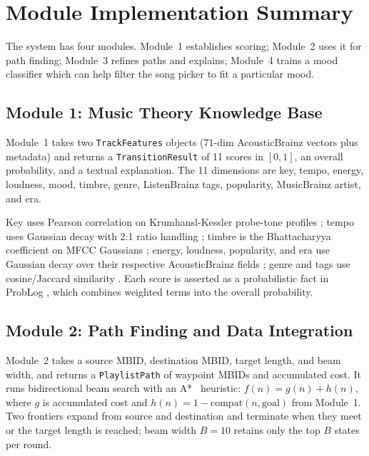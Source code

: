 \section{Module Implementation Summary}

The system has four modules. Module~1 establishes scoring; Module~2 uses it for path finding; Module~3 refines paths and explains; Module~4 trains a mood classifier which can help filter the song picker to fit a particular mood.

\subsection{Module 1: Music Theory Knowledge Base}

Module~1 takes two \texttt{TrackFeatures} objects (71-dim AcousticBrainz vectors plus metadata) and returns a \texttt{TransitionResult} of 11 scores in $[0,1]$, an overall probability, and a textual explanation. The 11 dimensions are key, tempo, energy, loudness, mood, timbre, genre, ListenBrainz tags, popularity, MusicBrainz artist, and era.

Key uses Pearson correlation on Krumhansl-Kessler probe-tone profiles \cite{krumhansl1990}; tempo uses Gaussian decay with 2:1 ratio handling \cite{drake1993}; timbre is the Bhattacharyya coefficient on MFCC Gaussians \cite{aucouturier2002,berenzweig2004}; energy, loudness, popularity, and era use Gaussian decay over their respective AcousticBrainz fields \cite{korzeniowski2021,schweiger2025}; genre and tags use cosine/Jaccard similarity \cite{alonso2022}. Each score is asserted as a probabilistic fact in ProbLog \cite{deraedt2007}, which combines weighted terms into the overall probability.

\subsection{Module 2: Path Finding and Data Integration}

Module~2 takes a source MBID, destination MBID, target length, and beam width, and returns a \texttt{PlaylistPath} of waypoint MBIDs and accumulated cost. It runs bidirectional beam search with an A*~\cite{hart1968} heuristic: $f(n) = g(n) + h(n)$, where $g$ is accumulated cost and $h(n) = 1 - \text{compat}(n, \text{goal})$ from Module~1. Two frontiers expand from source and destination and terminate when they meet or the target length is reached; beam width $B = 10$ retains only the top $B$ states per round.

